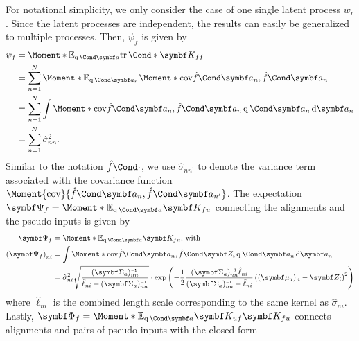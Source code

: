 For notational simplicity, we only consider the case of one single latent process $w_r$.
Since the latent processes are independent, the results can easily be generalized to multiple processes.
Then, $\psi_f$ is given by
\begin{equation}
    \begin{split}
        \psi_f &= \Moment*{\E_{\Variat{\rv{a}}}}{\Fun*{\tr}{\mat{K_{ff}}}} \\
        &= \sum_{n=1}^N \Moment*{\E_{\Variat{\rv{a}_n}}}{\Moment*{\cov}{\Fun{\hat{f}}{\mat{a}_n}, \Fun{\hat{f}}{\mat{a}_n}}} \\
        &= \sum_{n=1}^N \int \Moment*{\cov}{\Fun{\hat{f}}{\mat{a}_n}, \Fun{\hat{f}}{\mat{a}_n}} \Variat{\rv{a}_n} \diff \rv{a}_n \\
        &= \sum_{n=1}^N \hat{\sigma}_{nn}^2.
    \end{split}
\end{equation}
Similar to the notation $\Fun{\hat{f}}{\cdot}$, we use $\hat{\sigma}_{nn^\prime}$ to denote the variance term associated with the covariance function $\Moment{\cov}{\Fun{\hat{f}}{\mat{a}_n}, \Fun{\hat{f}}{\mat{a}_{n^\prime}}}$.
The expectation $\mat{\Psi_f} = \Moment*{\E_{\Variat{\rv{a}}}}{\mat{K_{fu}}}$ connecting the alignments and the pseudo inputs is given by
\begin{equation}
    \begin{split}
        \mat{\Psi_f} &= \Moment*{\E_{\Variat{\rv{a}}}}{\mat{K_{fu}}}\text{, with} \\
        \left( \mat{\Psi_f} \right)_{ni}
        &= \int \Moment*{\cov}{\Fun{\hat{f}}{\mat{a}_n}, \Fun{\hat{f}}{\mat{Z}_i}} \Variat{\rv{a}_n} \diff \rv{a}_n \\
        &= \hat{\sigma}_{ni}^2 \sqrt{\frac{(\mat{\Sigma}_a)_{nn}\inv}{\hat{\ell}_{ni} + (\mat{\Sigma}_a)_{nn}\inv}}
        \cdot \exp\left(-\frac{1}{2} \frac{(\mat{\Sigma}_a)_{nn}\inv\hat{\ell}_{ni}}{(\mat{\Sigma}_a)_{nn}\inv + \hat{\ell}_{ni}} \left((\mat{\mu}_a)_n - \mat{Z}_i\right)^2\right)
    \end{split}
\end{equation}
where $\hat{\ell}_{ni}$ is the combined length scale corresponding to the same kernel as $\hat{\sigma}_{ni}$.
Lastly, $\mat{\Phi_f} = \Moment*{\E_{\Variat{\rv{a}}}}{\mat{K_{uf}}\mat{K_{fu}}}$ connects alignments and pairs of pseudo inputs with the closed form
